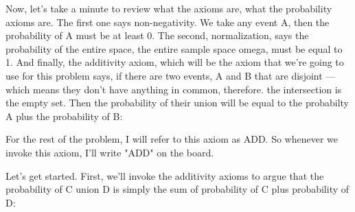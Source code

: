 \documentclass[pdftex, brazil, 12pt, twoside]{article}
\begin{document}
Now, let's take a minute to review what the axioms are,
what the probability axioms are.
The first one says non-negativity.
We take any event A, then the probability of A
must be at least 0.
The second, normalization, says the probability
of the entire space, the entire sample space omega,
must be equal to 1.
And finally, the additivity axiom,
which will be the axiom that we're
going to use for this problem says,
if there are two events, A and B that are disjoint --- which
means they don't have anything in common, therefore.
the intersection is the empty set.
Then the probability of their union
will be equal to the probabilty A plus the probability of B:

\begin{figure}[H]
  \begin{center}
  \end{center}
\end{figure}

For the rest of the problem, I will
refer to this axiom as ADD.
So whenever we invoke this axiom,
I'll write "ADD" on the board.

Let's get started.
First, we'll invoke the additivity axioms
to argue that the probability of C union D
is simply the sum of probability of C plus probability of D:

\begin{figure}[H]
  \begin{center}
  \end{center}
\end{figure}
\end{document}
